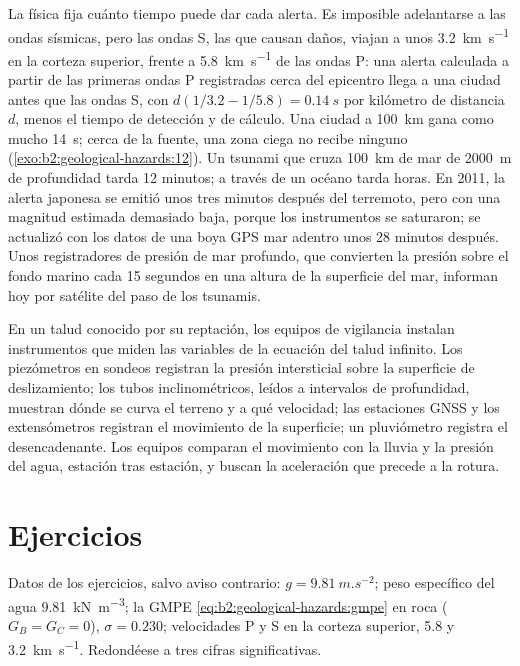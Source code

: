 La física fija cuánto tiempo puede dar cada alerta. Es imposible adelantarse a las ondas sísmicas, pero las ondas S,
las que causan daños, viajan a unos \qty{3.2}{km.s^{-1}} en la corteza superior, frente a \qty{5.8}{km.s^{-1}} de
las ondas P: una alerta calculada a partir de las primeras ondas P registradas cerca del epicentro llega a una ciudad
antes que las ondas S, con $d(1/3.2 - 1/5.8) = \qty{0.14}{s}$ por kilómetro de distancia $d$, menos el
tiempo de detección y de cálculo. Una ciudad a \qty{100}{km} gana como mucho \qty{14}{s}; cerca de la fuente, una
zona ciega no recibe ninguno (\cref{exo:b2:geological-hazards:12}). Un tsunami que cruza \qty{100}{km} de mar
de \qty{2000}{m} de profundidad tarda 12 minutos; a través de un océano tarda horas. En 2011, la alerta japonesa
se emitió unos tres minutos después del terremoto, pero con una magnitud estimada demasiado baja,
porque los instrumentos se saturaron; se actualizó con los datos de una boya GPS mar adentro unos 28 minutos después.
Unos registradores de presión de mar profundo, que convierten la presión sobre el fondo marino cada 15 segundos en una
altura de la superficie del mar, informan hoy por satélite del paso de los tsunamis.

\begin{inthefield}
En un talud conocido por su reptación, los equipos de vigilancia instalan instrumentos que miden las variables de la
ecuación del talud infinito. Los piezómetros en sondeos registran la presión intersticial sobre la superficie de deslizamiento;
los tubos inclinométricos, leídos a intervalos de profundidad, muestran dónde se curva el terreno y a qué velocidad; las estaciones
GNSS y los extensómetros registran el movimiento de la superficie; un pluviómetro registra el desencadenante.
Los equipos comparan el movimiento con la lluvia y la presión del agua, estación tras estación, y buscan
la aceleración que precede a la rotura.
\end{inthefield}

\section*{Ejercicios}\label{sec:b2:geological-hazards:exercises}

Datos de los ejercicios, salvo aviso contrario: $g = \qty{9.81}{m.s^{-2}}$; peso específico del agua
\qty{9.81}{kN.m^{-3}}; la GMPE \eqref{eq:b2:geological-hazards:gmpe} en roca ($G_B = G_C = 0$),
$\sigma = 0.230$; velocidades P y S en la corteza superior, 5.8 y \qty{3.2}{km.s^{-1}}. Redondéese a tres
cifras significativas.


